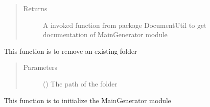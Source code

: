 \documentclass[letterpaper,10pt,english]{sphinxmanual}
\begin{document}
\begin{fulllineitems}
\begin{fulllineitems}
\begin{quote}
\begin{description}
\item[{Returns}] \leavevmode
A invoked function from package DocumentUtil to get documentation of MainGenerator module

\end{description}\end{quote}

\end{fulllineitems}


\begin{fulllineitems}
\label{\detokenize{AgentTools.GenericModelAgent:AgentTools.GenericModelAgent.MainGenerator.MainGenerator.remove_existing_folder}}
This function is to remove an existing folder
\begin{quote}\begin{description}
\item[{Parameters}] \leavevmode
{} () \textendash{} The path of the folder

\end{description}\end{quote}

\end{fulllineitems}


\end{fulllineitems}


\begin{fulllineitems}
\label{\detokenize{AgentTools.GenericModelAgent:AgentTools.GenericModelAgent.MainGenerator.initialize}}
This function is to initialize the MainGenerator module

\end{fulllineitems}
\end{document}
